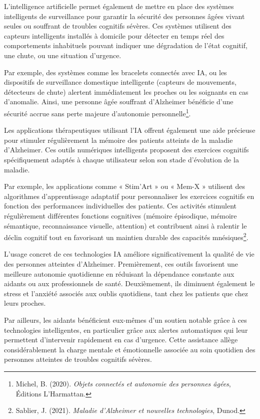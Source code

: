 \documentclass[11pt,a4paper]{report}
\begin{document}
L’intelligence artificielle permet également de mettre en place des systèmes intelligents de surveillance pour garantir la sécurité des personnes âgées vivant seules ou souffrant de troubles cognitifs sévères. Ces systèmes utilisent des capteurs intelligents installés à domicile pour détecter en temps réel des comportements inhabituels pouvant indiquer une dégradation de l’état cognitif, une chute, ou une situation d’urgence.

Par exemple, des systèmes comme les bracelets connectés avec IA, ou les dispositifs de surveillance domestique intelligente (capteurs de mouvements, détecteurs de chute) alertent immédiatement les proches ou les soignants en cas d’anomalie. Ainsi, une personne âgée souffrant d’Alzheimer bénéficie d’une sécurité accrue sans perte majeure d’autonomie personnelle\footnote{Michel, B. (2020). \textit{Objets connectés et autonomie des personnes âgées}, Éditions L'Harmattan.}.

Les applications thérapeutiques utilisant l’IA offrent également une aide précieuse pour stimuler régulièrement la mémoire des patients atteints de la maladie d’Alzheimer. Ces outils numériques intelligents proposent des exercices cognitifs spécifiquement adaptés à chaque utilisateur selon son stade d’évolution de la maladie.

Par exemple, les applications comme « Stim’Art » ou « Mem-X » utilisent des algorithmes d’apprentissage adaptatif pour personnaliser les exercices cognitifs en fonction des performances individuelles des patients. Ces activités stimulent régulièrement différentes fonctions cognitives (mémoire épisodique, mémoire sémantique, reconnaissance visuelle, attention) et contribuent ainsi à ralentir le déclin cognitif tout en favorisant un maintien durable des capacités mnésiques\footnote{Sablier, J. (2021). \textit{Maladie d’Alzheimer et nouvelles technologies}, Dunod.}.

L’usage concret de ces technologies IA améliore significativement la qualité de vie des personnes atteintes d’Alzheimer. Premièrement, ces outils favorisent une meilleure autonomie quotidienne en réduisant la dépendance constante aux aidants ou aux professionnels de santé. Deuxièmement, ils diminuent également le stress et l’anxiété associés aux oublis quotidiens, tant chez les patients que chez leurs proches.

Par ailleurs, les aidants bénéficient eux-mêmes d’un soutien notable grâce à ces technologies intelligentes, en particulier grâce aux alertes automatiques qui leur permettent d’intervenir rapidement en cas d’urgence. Cette assistance allège considérablement la charge mentale et émotionnelle associée au soin quotidien des personnes atteintes de troubles cognitifs sévères.
\end{document}

